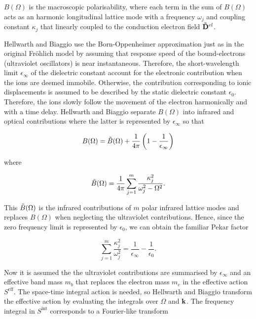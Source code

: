 $B(\Omega)$ is the macroscopic polarisability, where each term in the sum of $B(\Omega)$ acts as an harmonic longitudinal lattice mode with a frequency $\omega_j$ and coupling constant $\kappa_j$ that linearly coupled to the conduction electron field $\vb{\Tilde{D}}^{el}$. 

Hellwarth and Biaggio use the Born-Oppenheimer approximation just as in the original Fr\"ohlich model by assuming that response speed of the bound-electrons (ultraviolet oscillators) is near instantaneous. Therefore, the short-wavelength limit $\epsilon_\infty$ of the dielectric constant account for the electronic contribution when the ions are deemed immobile. Otherwise, the contribution corresponding to ionic displacements is assumed  to be described by the static dielectric constant $\epsilon_0$. Therefore, the ions slowly follow the movement of the electron harmonically and with a time delay. Hellwarth and Biaggio separate $B(\Omega)$ into infrared and optical contributions where the latter is represented by $\epsilon_\infty$ so that

\begin{equation}
    B(\Omega) = \Tilde{B}(\Omega) + \frac{1}{4\pi} \left( 1 - \frac{1}{\epsilon_\infty} \right)
\end{equation}

where

\begin{equation}
\Tilde{B}(\Omega) = \frac{1}{4\pi} \sum_{j=1}^m \frac{\kappa_j^2}{\omega_j^2 - \Omega^2}.  
\end{equation}

This $\Tilde{B}(\Omega)$ is the infrared contributions of $m$ polar infrared lattice modes and replaces $B(\Omega)$ when neglecting the ultraviolet contributions. Hence, since the zero frequency limit is represented by $\epsilon_0$, we can obtain the familiar Pekar factor

\begin{equation}
    \sum_{j=1}^m \frac{\kappa_j^2}{\omega_j^2} = \frac{1}{\epsilon_\infty} - \frac{1}{\epsilon_0}.
\end{equation}

Now it is assumed the the ultraviolet contributions are summarised by $\epsilon_\infty$ and an effective band mass $m_b$ that replaces the electron mass $m_e$ in the effective action $S^{\text{eff}}$. The space-time integral action is needed, so  Hellwarth and Biaggio transform the effective action by evaluating the integrals over $\Omega$ and $\vb{k}$. The frequency integral in $S^{\text{int}}$ corresponds to a Fourier-like transform

